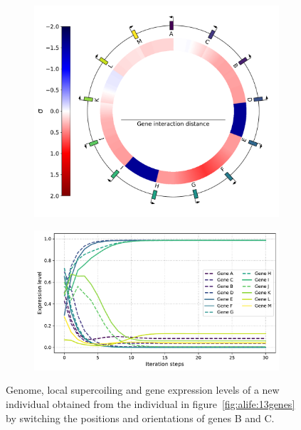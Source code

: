 \begin{figure}[H]
  \centering
  \begin{subfigure}[t]{0.42\textwidth}
    \includegraphics[width=\textwidth]{alife/img/inversion_genome.pdf}
    \label{subfig:alife:inversion_genome}
  \end{subfigure}
  \begin{subfigure}[t]{0.56\textwidth}
    \includegraphics[width=\textwidth]{alife/img/inversion_expr_level.pdf}
    \label{subfig:alife:inversion_expr}
  \end{subfigure}
  \caption[Effect of a genomic inversion on the example individual in Figure~\ref{fig:alife:13genes}]{Genome, local supercoiling and gene expression levels of a new individual obtained from the individual in figure~\ref{fig:alife:13genes} by switching the positions and orientations of genes B and C.}
  \label{fig:alife:inversion}
\end{figure}


